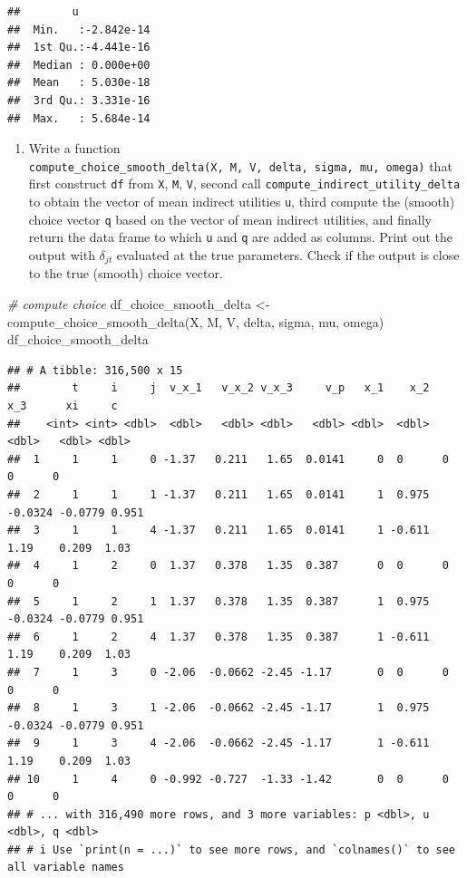 \documentclass[
]{book}
\newenvironment{Shaded}{\begin{snugshade}}{\end{snugshade}}
\newcommand{\CommentTok}[1]{\textcolor[rgb]{0.56,0.35,0.01}{\textit{#1}}}
\newcommand{\FunctionTok}[1]{\textcolor[rgb]{0.00,0.00,0.00}{#1}}
\newcommand{\NormalTok}[1]{#1}
\newcommand{\OtherTok}[1]{\textcolor[rgb]{0.56,0.35,0.01}{#1}}
\providecommand{\tightlist}{%
  \setlength{\itemsep}{0pt}\setlength{\parskip}{0pt}}
\begin{document}
\begin{verbatim}
##        u             
##  Min.   :-2.842e-14  
##  1st Qu.:-4.441e-16  
##  Median : 0.000e+00  
##  Mean   : 5.030e-18  
##  3rd Qu.: 3.331e-16  
##  Max.   : 5.684e-14
\end{verbatim}

\begin{enumerate}
\def\labelenumi{\arabic{enumi}.}
\setcounter{enumi}{5}
\tightlist
\item
  Write a function \texttt{compute\_choice\_smooth\_delta(X,\ M,\ V,\ delta,\ sigma,\ mu,\ omega)} that first construct \texttt{df} from \texttt{X}, \texttt{M}, \texttt{V}, second call \texttt{compute\_indirect\_utility\_delta} to obtain the vector of mean indirect utilities \texttt{u}, third compute the (smooth) choice vector \texttt{q} based on the vector of mean indirect utilities, and finally return the data frame to which \texttt{u} and \texttt{q} are added as columns. Print out the output with \(\delta_{jt}\) evaluated at the true parameters. Check if the output is close to the true (smooth) choice vector.
\end{enumerate}

\begin{Shaded}
\begin{Highlighting}[]
\CommentTok{\# compute choice}
\NormalTok{df\_choice\_smooth\_delta }\OtherTok{\textless{}{-}} 
  \FunctionTok{compute\_choice\_smooth\_delta}\NormalTok{(X, M, V, delta, sigma, mu, omega)}
\NormalTok{df\_choice\_smooth\_delta}
\end{Highlighting}
\end{Shaded}

\begin{verbatim}
## # A tibble: 316,500 x 15
##        t     i     j  v_x_1   v_x_2 v_x_3     v_p   x_1    x_2     x_3      xi     c
##    <int> <int> <dbl>  <dbl>   <dbl> <dbl>   <dbl> <dbl>  <dbl>   <dbl>   <dbl> <dbl>
##  1     1     1     0 -1.37   0.211   1.65  0.0141     0  0      0       0      0    
##  2     1     1     1 -1.37   0.211   1.65  0.0141     1  0.975 -0.0324 -0.0779 0.951
##  3     1     1     4 -1.37   0.211   1.65  0.0141     1 -0.611  1.19    0.209  1.03 
##  4     1     2     0  1.37   0.378   1.35  0.387      0  0      0       0      0    
##  5     1     2     1  1.37   0.378   1.35  0.387      1  0.975 -0.0324 -0.0779 0.951
##  6     1     2     4  1.37   0.378   1.35  0.387      1 -0.611  1.19    0.209  1.03 
##  7     1     3     0 -2.06  -0.0662 -2.45 -1.17       0  0      0       0      0    
##  8     1     3     1 -2.06  -0.0662 -2.45 -1.17       1  0.975 -0.0324 -0.0779 0.951
##  9     1     3     4 -2.06  -0.0662 -2.45 -1.17       1 -0.611  1.19    0.209  1.03 
## 10     1     4     0 -0.992 -0.727  -1.33 -1.42       0  0      0       0      0    
## # ... with 316,490 more rows, and 3 more variables: p <dbl>, u <dbl>, q <dbl>
## # i Use `print(n = ...)` to see more rows, and `colnames()` to see all variable names
\end{verbatim}
\end{document}
